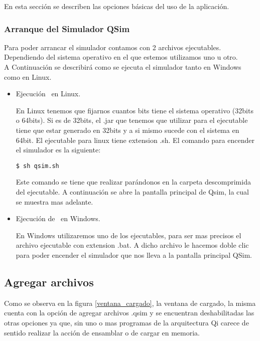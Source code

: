 
En esta sección se describen las opciones básicas del uso de la aplicación.

\subsubsection{Arranque del Simulador QSim}
Para poder arrancar el simulador contamos con 2 archivos ejecutables. 
Dependiendo del sistema operativo en el que estemos utilizamos uno u otro.\\

A Continuación se describirá como se ejecuta el simulador \qsim tanto en Windows como en Linux.
\begin{itemize}

\item Ejecución \qsim\ en Linux.

En Linux tenemos que fijarnos cuantos bits tiene el sistema operativo (32bits o 64bits). Si es de 32bits, el .jar que tenemos que utilizar para el ejecutable tiene que estar generado en 32bits y a si mismo sucede con el sistema en 64bit. El ejecutable para linux tiene extension .sh. El comando para encender el simulador es la siguiente:

\begin{verbatim}
$ sh qsim.sh
\end{verbatim}

Este comando se tiene que realizar parándonos en la carpeta descomprimida del ejecutable. 
A continuación se abre la pantalla principal de Qsim, la cual se muestra mas adelante.

\item Ejecución de \qsim\ en Windows.

En Windows utilizaremos uno de los ejecutables, para ser mas precisos el archivo ejecutable con extension .bat.
A dicho archivo le hacemos doble clic para poder encender el simulador que nos lleva a la pantalla principal QSim.

 
\end{itemize}

\subsection{Agregar archivos}
Como se observa en la figura \ref{ventana_cargado}, la ventana de cargado, la misma cuenta con la opción de agregar archivos .qsim y se encuentran deshabilitadas las otras opciones ya que, sin uno o mas programas de la arquitectura Qi carece de sentido realizar la acción de ensamblar o de cargar en memoria.


